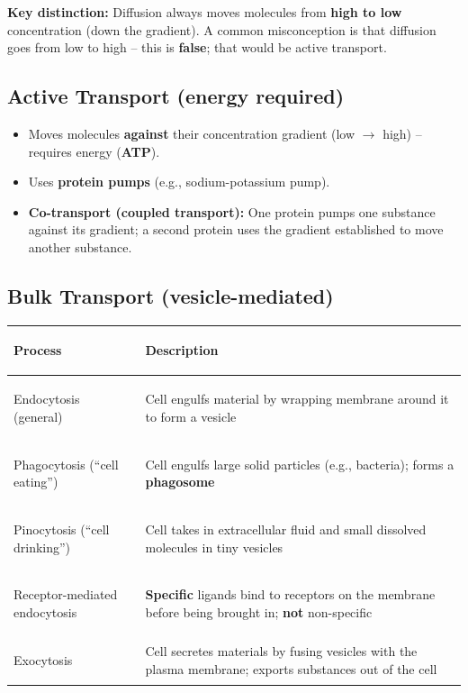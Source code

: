 \documentclass[11pt, letterpaper]{article}
\begin{document}
\begin{tcolorbox}[colback=part5bg, colframe=sectionteal, arc=3pt, boxrule=1pt]
\textbf{Key distinction:} Diffusion always moves molecules from \textbf{high to low} concentration (down the gradient). A common misconception is that diffusion goes from low to high -- this is \textbf{false}; that would be active transport.
\end{tcolorbox}

\subsection*{Active Transport (energy required)}
\begin{itemize}[noitemsep]
  \item Moves molecules \textbf{against} their concentration gradient (low $\to$ high) -- requires energy (\textbf{ATP}).
  \item Uses \textbf{protein pumps} (e.g., sodium-potassium pump).
  \item \textbf{Co-transport (coupled transport):} One protein pumps one substance against its gradient; a second protein uses the gradient established to move another substance.
\end{itemize}

\subsection*{Bulk Transport (vesicle-mediated)}

\noindent
{\renewcommand{\arraystretch}{1.5}
\begin{tabularx}{\textwidth}{>{\bfseries\raggedright\arraybackslash}p{4cm}>{\raggedright\arraybackslash}X}
\toprule
\rowcolor{tableheaderteal}
\textbf{Process} & \textbf{Description} \\
\midrule
\rowcolor{rowTe}
Endocytosis (general)
  & Cell engulfs material by wrapping membrane around it to form a vesicle \\
\rowcolor{rowA}
Phagocytosis (``cell eating'')
  & Cell engulfs large solid particles (e.g., bacteria); forms a \textbf{phagosome} \\
\rowcolor{rowTe}
Pinocytosis (``cell drinking'')
  & Cell takes in extracellular fluid and small dissolved molecules in tiny vesicles \\
\rowcolor{rowA}
Receptor-mediated endocytosis
  & \textbf{Specific} ligands bind to receptors on the membrane before being brought in; \textbf{not} non-specific \\
\rowcolor{rowTe}
Exocytosis
  & Cell secretes materials by fusing vesicles with the plasma membrane; exports substances out of the cell \\
\bottomrule
\end{tabularx}}
\end{document}
